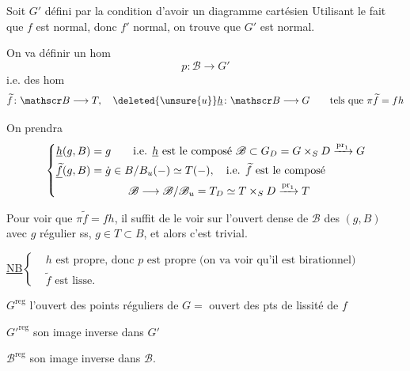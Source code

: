 Soit $G'$ défini par la condition d'avoir un diagramme cartésien
Utilisant le fait que $f$ est normal, donc $f'$ normal, on trouve que  $G'$ est normal.

On va définir un hom
\[
p\colon\mathscr B\longrightarrow G'
\]
i.e. des hom
\[
\widetilde f\colon\mathscr B\longrightarrow T,\quad
\deleted{\unsure{u}}\underline h\colon\mathscr B\longrightarrow G
\qquad\text{tels que }\pi\widetilde f=fh
\]

On prendra
\[
\left\{\begin{aligned}
\underline h(g,B)&=g\qquad \text{i.e. }\underline h\text{ est le composé }\mathscr B\subset G_D=G\times_S D\xrightarrow{\mathrm{pr}_1}G\\
\underline{\widetilde f}(g,B)&=\dot g\in B/B_u(-)\simeq T(-),\quad\text{i.e. }\widetilde f\text{ est le composé}\\
&\hspace{12mm}\mathscr B\longrightarrow\mathscr B/\mathscr B_u=T_D\simeq T\times_S D\xrightarrow{\mathrm{pr}_1}T
\end{aligned}\right.
\]

Pour voir que $\pi\widetilde f=fh$, il suffit de le voir sur l'ouvert dense  de $\mathscr B$ des  $(g,B)$ avec $g$ régulier ss,   $g\in T\subset B$, et alors c'est trivial.

\uline{NB}\quad $\left\{\begin{aligned}
&h\text{ est propre, donc }p\text{ est propre (on va voir qu'il est birationnel)}\\
&\widetilde f\text{ est lisse.}
\end{aligned}\right.$

$G^{\mathrm{reg}}$ l'ouvert des points réguliers de $G=$ ouvert des pts de lissité de $f$

$G'^{\mathrm{reg}}$ son image inverse dans $G'$

$\mathscr B^{\mathrm{reg}}$ son image inverse dans $\mathscr B$.
